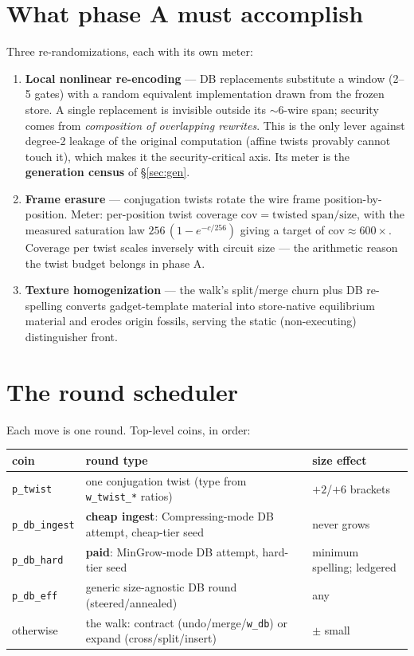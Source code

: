\documentclass[11pt]{article}
\newcommand{\code}[1]{\texttt{#1}}
\begin{document}
\section{What phase A must accomplish}
Three re-randomizations, each with its own meter:
\begin{enumerate}
\item \textbf{Local nonlinear re-encoding} --- DB replacements substitute a
window (2--5 gates) with a random equivalent implementation drawn from the
frozen store. A single replacement is invisible outside its $\sim$6-wire
span; security comes from \emph{composition of overlapping rewrites}. This
is the only lever against degree-2 leakage of the original computation
(affine twists provably cannot touch it), which makes it the
security-critical axis. Its meter is the \textbf{generation census} of
\S\ref{sec:gen}.
\item \textbf{Frame erasure} --- conjugation twists rotate the wire frame
position-by-position. Meter: per-position twist coverage
$\mathrm{cov} = \text{twisted span}/\text{size}$, with the measured
saturation law $256\,(1-e^{-c/256})$ giving a target of
$\mathrm{cov}\approx 600\times$. Coverage per twist scales inversely with
circuit size --- the arithmetic reason the twist budget belongs in phase A.
\item \textbf{Texture homogenization} --- the walk's split/merge churn plus
DB re-spelling converts gadget-template material into store-native
equilibrium material and erodes origin fossils, serving the static
(non-executing) distinguisher front.
\end{enumerate}

\section{The round scheduler}
Each move is one round. Top-level coins, in order:

\begin{center}\small
\begin{tabular}{lll}
\toprule
coin & round type & size effect \\
\midrule
\code{p\_twist} & one conjugation twist (type from \code{w\_twist\_*} ratios) & $+2$/$+6$ brackets \\
\code{p\_db\_ingest} & \textbf{cheap ingest}: Compressing-mode DB attempt, cheap-tier seed & never grows \\
\code{p\_db\_hard} & \textbf{paid}: MinGrow-mode DB attempt, hard-tier seed & minimum spelling; ledgered \\
\code{p\_db\_eff} & generic size-agnostic DB round (steered/annealed) & any \\
otherwise & the walk: contract (undo/merge/\code{w\_db}) or expand (cross/split/insert) & $\pm$ small \\
\bottomrule
\end{tabular}
\end{center}
\end{document}
